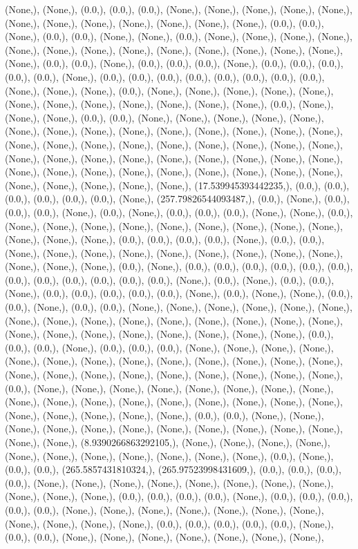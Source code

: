 \documentclass{article}
\begin{document}
(None,), (None,), (0.0,), (0.0,), (0.0,), (None,), (None,), (None,), (None,), (None,), (None,), (None,), (None,), (None,), (None,), (None,), (None,), (0.0,), (0.0,), (None,), (0.0,), (0.0,), (None,), (None,), (0.0,), (None,), (None,), (None,), (None,), (None,), (None,), (None,), (None,), (None,), (None,), (None,), (None,), (None,), (None,), (0.0,), (0.0,), (None,), (0.0,), (0.0,), (0.0,), (None,), (0.0,), (0.0,), (0.0,), (0.0,), (0.0,), (None,), (0.0,), (0.0,), (0.0,), (0.0,), (0.0,), (0.0,), (0.0,), (0.0,), (None,), (None,), (None,), (0.0,), (None,), (None,), (None,), (None,), (None,), (None,), (None,), (None,), (None,), (None,), (None,), (None,), (0.0,), (None,), (None,), (None,), (0.0,), (0.0,), (None,), (None,), (None,), (None,), (None,), (None,), (None,), (None,), (None,), (None,), (None,), (None,), (None,), (None,), (None,), (None,), (None,), (None,), (None,), (None,), (None,), (None,), (None,), (None,), (None,), (None,), (None,), (None,), (None,), (None,), (None,), (None,), (None,), (None,), (None,), (None,), (None,), (None,), (None,), (None,), (None,), (None,), (None,), (None,), (None,), (None,), (17.539945393442235,), (0.0,), (0.0,), (0.0,), (0.0,), (0.0,), (0.0,), (None,), (257.79826544093487,), (0.0,), (None,), (0.0,), (0.0,), (0.0,), (None,), (0.0,), (None,), (0.0,), (0.0,), (0.0,), (None,), (None,), (0.0,), (None,), (None,), (None,), (None,), (None,), (None,), (None,), (None,), (None,), (None,), (None,), (None,), (0.0,), (0.0,), (0.0,), (0.0,), (None,), (0.0,), (0.0,), (None,), (None,), (None,), (None,), (None,), (None,), (None,), (None,), (None,), (None,), (None,), (None,), (0.0,), (None,), (0.0,), (0.0,), (0.0,), (0.0,), (0.0,), (0.0,), (0.0,), (0.0,), (0.0,), (0.0,), (0.0,), (0.0,), (None,), (0.0,), (None,), (0.0,), (0.0,), (None,), (0.0,), (0.0,), (0.0,), (0.0,), (0.0,), (None,), (0.0,), (None,), (None,), (0.0,), (0.0,), (None,), (0.0,), (0.0,), (None,), (None,), (None,), (None,), (None,), (None,), (None,), (None,), (None,), (None,), (None,), (None,), (None,), (None,), (None,), (None,), (None,), (None,), (None,), (None,), (None,), (None,), (None,), (0.0,), (0.0,), (0.0,), (None,), (0.0,), (0.0,), (0.0,), (None,), (None,), (None,), (None,), (None,), (None,), (None,), (None,), (None,), (None,), (None,), (None,), (None,), (None,), (None,), (None,), (None,), (None,), (None,), (None,), (None,), (None,), (0.0,), (None,), (None,), (None,), (None,), (None,), (None,), (None,), (None,), (None,), (None,), (None,), (None,), (None,), (None,), (None,), (None,), (None,), (None,), (None,), (None,), (None,), (None,), (0.0,), (0.0,), (None,), (None,), (None,), (None,), (None,), (None,), (None,), (None,), (None,), (None,), (None,), (None,), (None,), (8.9390266863292105,), (None,), (None,), (None,), (None,), (None,), (None,), (None,), (None,), (None,), (None,), (None,), (0.0,), (None,), (0.0,), (0.0,), (265.5857431810324,), (265.97523998431609,), (0.0,), (0.0,), (0.0,), (0.0,), (None,), (None,), (None,), (None,), (None,), (None,), (None,), (None,), (None,), (None,), (None,), (0.0,), (0.0,), (0.0,), (0.0,), (None,), (0.0,), (0.0,), (0.0,), (0.0,), (0.0,), (None,), (None,), (None,), (None,), (None,), (None,), (None,), (None,), (None,), (None,), (None,), (0.0,), (0.0,), (0.0,), (0.0,), (0.0,), (None,), (0.0,), (0.0,), (None,), (None,), (None,), (None,), (None,), (None,), (None,), 
\end{document}
